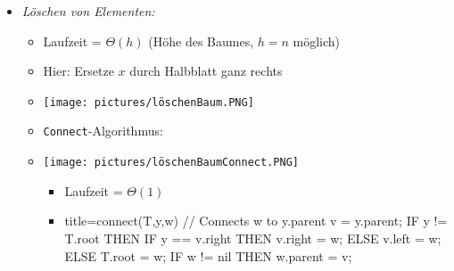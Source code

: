 \documentclass[
    12pt,
    a4paper,
    ngerman,
    color=3b,%
    marginpar=false,
    colorback=false,
    leqno,
]{tudaexercise}
\begin{document}
\begin{itemize}
\begin{itemize}
              \item \textit{Löschen von Elementen:}
                    \begin{itemize}
                        \item Laufzeit = $\Theta(h)$ (Höhe des Baumes, $h=n$ möglich)
                        \item Hier: Ersetze $x$ durch Halbblatt ganz rechts
                        \item[] \texttt{[image: pictures/löschenBaum.PNG]}
                              \pagebreak
                        \item \texttt{Connect}-Algorithmus:
                        \item[]
                              \begin{minipage}[t]{0.35\textwidth}
                                  \texttt{[image: pictures/löschenBaumConnect.PNG]}
                              \end{minipage}
                              \begin{minipage}[t]{0.45\textwidth}
                                  \vspace{-7cm}
                                  \begin{itemize}
                                      \item Laufzeit = $\Theta(1)$
                                      \item[]
                                            \begin{codeBlock}[autogobble]{title={connect(T,y,w) // Connects w to y.parent}}
                                                v = y.parent;
                                                IF y != T.root THEN
                                                    IF y == v.right THEN
                                                        v.right = w;
                                                    ELSE
                                                        v.left = w;
                                                ELSE
                                                    T.root = w;
                                                IF w != nil THEN
                                                    w.parent = v;
                                            \end{codeBlock}
                                  \end{itemize}
                              \end{minipage}


\end{itemize}
\end{itemize}
\end{itemize}
\end{document}
